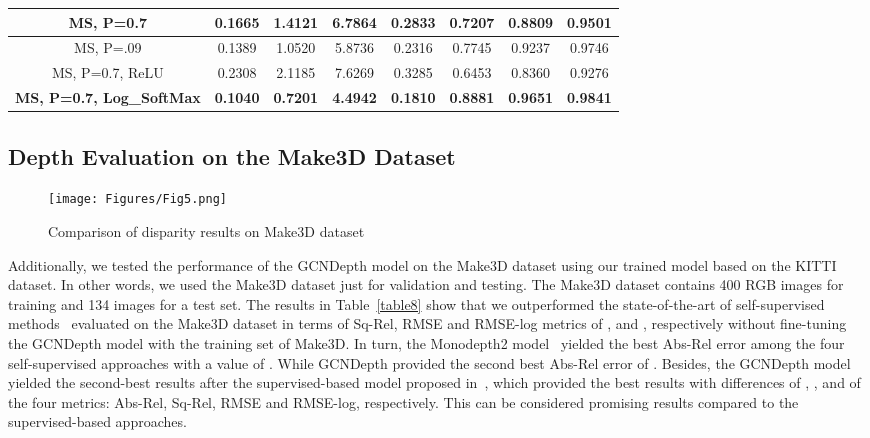 \documentclass[journal]{IEEEtran}
\begin{document}
\begin{table*}[t]
\begin{tabular}{|c|c|c|c|c|c|c|c|}
MS, P=0.7                                                      & 0.1665            & 1.4121           & 6.7864          & 0.2833            & 0.7207                    & 0.8809                    & 0.9501                    \\ \hline
MS, P=.09                                                      & 0.1389            & 1.0520           & 5.8736          & 0.2316            & 0.7745                    & 0.9237                    & 0.9746                    \\ \hline
MS, P=0.7, ReLU                                                & 0.2308            & 2.1185           & 7.6269          & 0.3285            & 0.6453                    & 0.8360                    & 0.9276                    \\ \hline
\textbf{MS, P=0.7, Log\_SoftMax}                               & \textbf{0.1040}   & \textbf{0.7201}  & \textbf{4.4942} & \textbf{0.1810}   & \textbf{0.8881}           & \textbf{0.9651}           & \textbf{0.9841}           \\ \hline
\end{tabular}
\label{table7}
\end{table*}



\subsection{Depth Evaluation on the Make3D Dataset}

\begin{figure}[h!]
\centering\texttt{[image: Figures/Fig5.png]}
\caption{Comparison of disparity results on Make3D dataset}
\label{Fig5}
\end{figure}


Additionally, we tested the performance of the GCNDepth model on the Make3D dataset using our trained model based on the KITTI dataset. In other words, we used the Make3D dataset just for validation and testing. The Make3D dataset contains 400 RGB images for training and 134 images for a test set. The results in Table~\ref{table8} show that we outperformed the state-of-the-art of self-supervised methods~\cite{Godard2018,Wang,Zhou2017} evaluated on the Make3D dataset in terms of Sq-Rel, RMSE and RMSE-log metrics of ,  and , respectively without fine-tuning the GCNDepth model with the training set of Make3D. In turn, the Monodepth2 model~\cite{Godard2018} yielded the best Abs-Rel error among the four self-supervised approaches with a value of . While GCNDepth provided the second best Abs-Rel error of . Besides, the GCNDepth model yielded the second-best results after the supervised-based model proposed in~\cite{Laina2016}, which provided the best results with differences of , ,  and  of the four metrics: Abs-Rel, Sq-Rel, RMSE and RMSE-log, respectively. This can be considered promising results compared to the supervised-based approaches.
\end{document}
